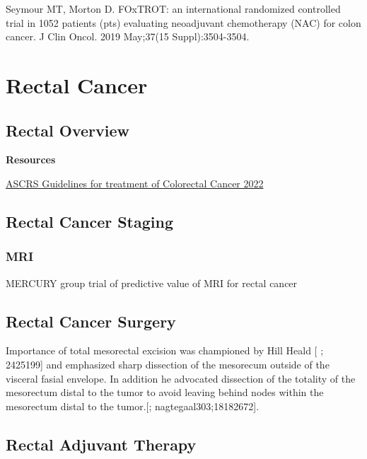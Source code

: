 \documentclass[
]{book}
\begin{document}
Seymour MT, Morton D. FOxTROT: an international randomized controlled trial in 1052 patients (pts) evaluating neoadjuvant chemotherapy (NAC) for colon cancer. J Clin Oncol. 2019 May;37(15 Suppl):3504-3504.

\hypertarget{part-rectal-cancer}{%
\part*{Rectal Cancer}\label{part-rectal-cancer}}

\hypertarget{rectal-overview}{%
\chapter{Rectal Overview}\label{rectal-overview}}

\textbf{Resources}

\href{https://fascrs.org/ascrs/media/files/downloads/2022-Colon-Cancer-CPG.pdf}{ASCRS Guidelines for treatment of Colorectal Cancer 2022}

\hypertarget{rectal-cancer-staging}{%
\chapter{Rectal Cancer Staging}\label{rectal-cancer-staging}}

\hypertarget{mri}{%
\section{MRI}\label{mri}}

MERCURY group trial of predictive value of MRI for rectal cancer\citep{taylor34}\citep{mercurystudygroup779}

\hypertarget{rectal-cancer-surgery}{%
\chapter{Rectal Cancer Surgery}\label{rectal-cancer-surgery}}

Importance of total mesorectal excision was championed by Hill Heald {[}\citet{heald1479} ; 2425199{]} and emphasized sharp dissection of the mesorecum outside of the visceral fasial envelope. In addition he advocated dissection of the totality of the mesorectum distal to the tumor to avoid leaving behind nodes within the mesorectum distal to the tumor.{[}\citet{quirke996}; nagtegaal303;18182672{]}. \citep{paty365}

\hypertarget{rectal-adjuvant-therapy}{%
\chapter{Rectal Adjuvant Therapy}\label{rectal-adjuvant-therapy}}
\end{document}
